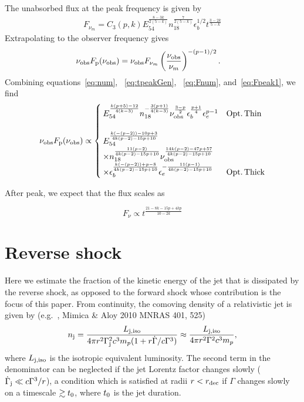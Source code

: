\documentclass[usenatbib,fleqn]{mnras}
\begin{document}
The unabsorbed flux at the peak frequency is given by
\begin{align}
  F_{\nu_m} =  C_3(p, k) E_{54}^{\frac{8-3 k}{2 (5-k)}}
  n_{18}^{\frac{7}{2 (5-k)}} \epsilon_b^{1/2} t^{\frac{3-2 k}{5-k}}
\label{eq:Fnum}
\end{align}
%
Extrapolating to the observer frequency gives 
\begin{align}
  \nu_{\rm obs} F_{\rm p} (\nu_{\rm obs}) &= \nu_{\rm obs}   F_{\nu_m}
  \left(\frac{\nu_{\rm obs}}{\nu_m}\right)^{-(p-1)/2}.
  \label{eq:Fpeak1}
\end{align}
%
Combining equations~\eqref{eq:num}, ~\eqref{eq:tpeakGen}, ~\eqref{eq:Fnum},
and~\eqref{eq:Fpeak1}, we find
\begin{align}
  \nu_{\rm obs} F_{\rm p} (\nu_{\rm obs}) \propto
  \begin{cases}
    E_{54}^{\frac{k (p+5)-12}{4 (k-3)}} n_{18}^{-\frac{3 (p+1)}{4
        (k-3)}} \nu_{\rm obs}^{\frac{3-p}{2}}
    \epsilon_b^{\frac{p+1}{4}} \epsilon_e^{p-1} & {\rm Opt.\, Thin}\\\\
    E_{54}^{\frac{k(-(p-2))-10 p+3}{4 k (p-2)-15 p+10}} \\ \times
    n_{18}^{\frac{11 (p-2)}{4 k (p-2)-15 p+10}} \nu_{\rm
      obs}^{\frac{14 k (p-2)-47 p+57}{4 k (p-2)-15 p+10}} \\ \times
    \epsilon_b^{\frac{k (-(p-2))+p-8}{4 k(p-2)-15 p+10}}
    \epsilon_e^{-\frac{11 (p-1)}{4 k (p-2)-15p+10}} & {\rm Opt.\,
    Thick}
  \end{cases}
  \label{eq:peakLumGen}
\end{align}

After peak, we expect that the flux scales as 

\begin{equation}
F_{\nu}\propto t^{\frac{21-8k-15p+4kp}{10-2k}}
\label{eq:tslope}
\end{equation}



\section{Reverse shock}
\label{sec:reverse}
Here we estimate the fraction of the kinetic energy of the jet that is
dissipated by the reverse shock, as opposed to the forward shock whose
contribution is the focus of this paper.  From continuity, the
comoving density of a relativistic jet is given by
(e.g.~\citealt{Beloborodov&Uhm2006},  Mimica \& Aloy 2010 MNRAS 401, 525)
 \begin{align}
   n_{\rm j} =  \frac{L_{\rm j, iso}}{4 \pi r^{2}\Gamma_{\rm
       j}^{2}c^{3}m_p(1 + r \dot{\Gamma}/c\Gamma^{3})}
   \approx  \frac{L_{\rm j, iso}}{4 \pi r^{2}\Gamma^{2}c^{3}m_p},
\end{align}
%
where $L_{\rm j, iso}$ is the isotropic equivalent luminosity.  The
second term in the denominator can be neglected if the jet Lorentz
factor changes slowly ($\dot{\Gamma}_{\rm j} \ll c\Gamma^{3}/r$), a
condition which is satisfied at radii $r < r_{\rm dec}$ if $\Gamma$
changes slowly on a timescale $\gtrsim t_{\rm 0}$, where $t_{\rm 0}$
is the jet duration.
\end{document}
